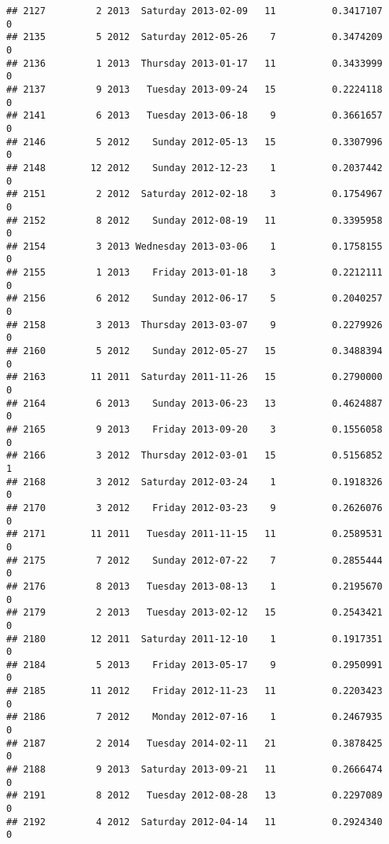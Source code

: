 \documentclass[
]{article}
\begin{document}
\begin{verbatim}
## 2127         2 2013  Saturday 2013-02-09   11          0.3417107             0
## 2135         5 2012  Saturday 2012-05-26    7          0.3474209             0
## 2136         1 2013  Thursday 2013-01-17   11          0.3433999             0
## 2137         9 2013   Tuesday 2013-09-24   15          0.2224118             0
## 2141         6 2013   Tuesday 2013-06-18    9          0.3661657             0
## 2146         5 2012    Sunday 2012-05-13   15          0.3307996             0
## 2148        12 2012    Sunday 2012-12-23    1          0.2037442             0
## 2151         2 2012  Saturday 2012-02-18    3          0.1754967             0
## 2152         8 2012    Sunday 2012-08-19   11          0.3395958             0
## 2154         3 2013 Wednesday 2013-03-06    1          0.1758155             0
## 2155         1 2013    Friday 2013-01-18    3          0.2212111             0
## 2156         6 2012    Sunday 2012-06-17    5          0.2040257             0
## 2158         3 2013  Thursday 2013-03-07    9          0.2279926             0
## 2160         5 2012    Sunday 2012-05-27   15          0.3488394             0
## 2163        11 2011  Saturday 2011-11-26   15          0.2790000             0
## 2164         6 2013    Sunday 2013-06-23   13          0.4624887             0
## 2165         9 2013    Friday 2013-09-20    3          0.1556058             0
## 2166         3 2012  Thursday 2012-03-01   15          0.5156852             1
## 2168         3 2012  Saturday 2012-03-24    1          0.1918326             0
## 2170         3 2012    Friday 2012-03-23    9          0.2626076             0
## 2171        11 2011   Tuesday 2011-11-15   11          0.2589531             0
## 2175         7 2012    Sunday 2012-07-22    7          0.2855444             0
## 2176         8 2013   Tuesday 2013-08-13    1          0.2195670             0
## 2179         2 2013   Tuesday 2013-02-12   15          0.2543421             0
## 2180        12 2011  Saturday 2011-12-10    1          0.1917351             0
## 2184         5 2013    Friday 2013-05-17    9          0.2950991             0
## 2185        11 2012    Friday 2012-11-23   11          0.2203423             0
## 2186         7 2012    Monday 2012-07-16    1          0.2467935             0
## 2187         2 2014   Tuesday 2014-02-11   21          0.3878425             0
## 2188         9 2013  Saturday 2013-09-21   11          0.2666474             0
## 2191         8 2012   Tuesday 2012-08-28   13          0.2297089             0
## 2192         4 2012  Saturday 2012-04-14   11          0.2924340             0

\end{verbatim}
\end{document}
